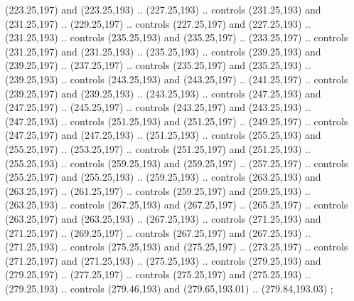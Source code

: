 \documentclass[twocolumn]{article}
\numberwithin{equation}{section}
\newcommand{\0}{\textcolor{gray}{0}}
\begin{document}
(223.25,197) and (223.25,193) .. (227.25,193) .. controls (231.25,193) and (231.25,197) .. (229.25,197) .. controls (227.25,197) and (227.25,193) .. (231.25,193) .. controls (235.25,193) and (235.25,197) .. (233.25,197) .. controls (231.25,197) and (231.25,193) .. (235.25,193) .. controls (239.25,193) and (239.25,197) .. (237.25,197) .. controls (235.25,197) and (235.25,193) .. (239.25,193) .. controls (243.25,193) and (243.25,197) .. (241.25,197) .. controls (239.25,197) and (239.25,193) .. (243.25,193) .. controls (247.25,193) and (247.25,197) .. (245.25,197) .. controls (243.25,197) and (243.25,193) .. (247.25,193) .. controls (251.25,193) and (251.25,197) .. (249.25,197) .. controls (247.25,197) and (247.25,193) .. (251.25,193) .. controls (255.25,193) and (255.25,197) .. (253.25,197) .. controls (251.25,197) and (251.25,193) .. (255.25,193) .. controls (259.25,193) and (259.25,197) .. (257.25,197) .. controls (255.25,197) and (255.25,193) .. (259.25,193) .. controls (263.25,193) and (263.25,197) .. (261.25,197) .. controls (259.25,197) and (259.25,193) .. (263.25,193) .. controls (267.25,193) and (267.25,197) .. (265.25,197) .. controls (263.25,197) and (263.25,193) .. (267.25,193) .. controls (271.25,193) and (271.25,197) .. (269.25,197) .. controls (267.25,197) and (267.25,193) .. (271.25,193) .. controls (275.25,193) and (275.25,197) .. (273.25,197) .. controls (271.25,197) and (271.25,193) .. (275.25,193) .. controls (279.25,193) and (279.25,197) .. (277.25,197) .. controls (275.25,197) and (275.25,193) .. (279.25,193) .. controls (279.46,193) and (279.65,193.01) .. (279.84,193.03) ;
\end{document}
